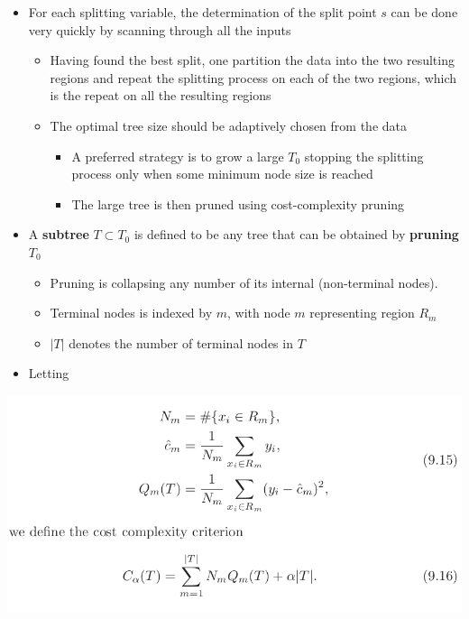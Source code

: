 \documentclass[11pt]{article}
\begin{document}
\begin{itemize}
\item For each splitting variable, the determination of the split point \(s\) can be done very quickly by scanning through all the inputs
\begin{itemize}
\item Having found the best split, one partition the data into the two resulting regions and repeat the splitting process on each of the two regions, which is the repeat on all the resulting regions
\item The optimal tree size should be adaptively chosen from the data
\begin{itemize}
\item A preferred strategy is to grow a large \(T_0\) stopping the splitting process only when some minimum node size is reached
\item The large tree is then pruned using cost-complexity pruning
\end{itemize}
\end{itemize}

\item A \textbf{subtree} \(T \subset T_0\) is defined to be any tree that can be obtained by \textbf{pruning} \(T_0\)
\begin{itemize}
\item Pruning is collapsing any number of its internal (non-terminal nodes).
\item Terminal nodes is indexed by \(m\), with node \(m\) representing region \(R_m\)
\item \(|T|\) denotes the number of terminal nodes in \(T\)
\end{itemize}
\item Letting
\end{itemize}
\begin{center}
\includegraphics[width=.9\linewidth]{Tree-Based Methods/screenshot_2018-10-08_16-27-26.png}
\end{center}
\end{document}
